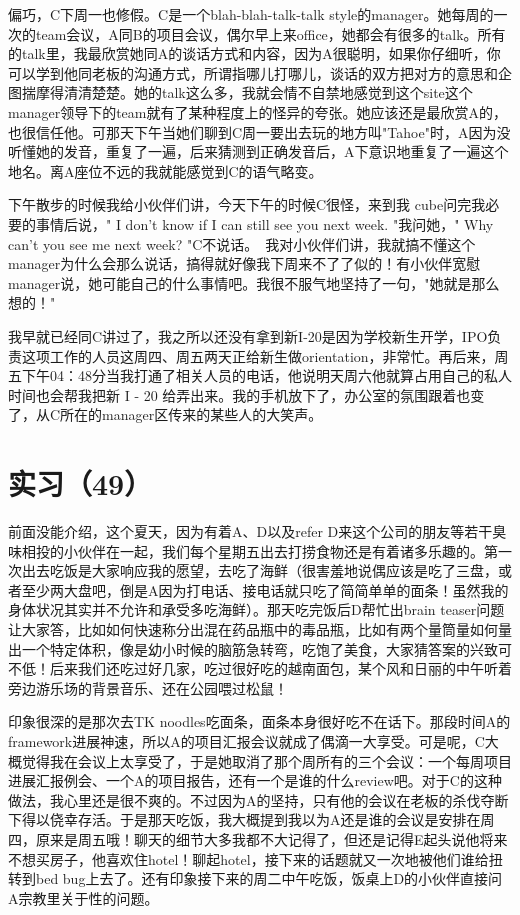 \documentclass[12pt]{book}
\begin{document}
偏巧，C下周一也修假。C是一个blah-blah-talk-talk style的manager。她每周的一次的team会议，A同B的项目会议，偶尔早上来office，她都会有很多的talk。所有的talk里，我最欣赏她同A的谈话方式和内容，因为A很聪明，如果你仔细听，你可以学到他同老板的沟通方式，所谓指哪儿打哪儿，谈话的双方把对方的意思和企图揣摩得清清楚楚。她的talk这么多，我就会情不自禁地感觉到这个site这个manager领导下的team就有了某种程度上的怪异的夸张。她应该还是最欣赏A的，也很信任他。可那天下午当她们聊到C周一要出去玩的地方叫"Tahoe"时，A因为没听懂她的发音，重复了一遍，后来猜测到正确发音后，A下意识地重复了一遍这个地名。离A座位不远的我就能感觉到C的语气略变。

下午散步的时候我给小伙伴们讲，今天下午的时候C很怪，来到我  cube问完我必要的事情后说，" I don't know if I can still see you next week. "我问她，" Why can't you see me next week? "C不说话。　我对小伙伴们讲，我就搞不懂这个manager为什么会那么说话，搞得就好像我下周来不了了似的！有小伙伴宽慰manager说，她可能自己的什么事情吧。我很不服气地坚持了一句，"她就是那么想的！"

我早就已经同C讲过了，我之所以还没有拿到新I-20是因为学校新生开学，IPO负责这项工作的人员这周四、周五两天正给新生做orientation，非常忙。再后来，周五下午04：48分当我打通了相关人员的电话，他说明天周六他就算占用自己的私人时间也会帮我把新 I - 20 给弄出来。我的手机放下了，办公室的氛围跟着也变了，从C所在的manager区传来的某些人的大笑声。　


\section{实习（49）}
\label{sec-5-52}

前面没能介绍，这个夏天，因为有着A、D以及refer D来这个公司的朋友等若干臭味相投的小伙伴在一起，我们每个星期五出去打捞食物还是有着诸多乐趣的。第一次出去吃饭是大家响应我的愿望，去吃了海鲜（很害羞地说偶应该是吃了三盘，或者至少两大盘吧，倒是A因为打电话、接电话就只吃了简简单单的面条！虽然我的身体状况其实并不允许和承受多吃海鲜）。那天吃完饭后D帮忙出brain teaser问题让大家答，比如如何快速称分出混在药品瓶中的毒品瓶，比如有两个量筒量如何量出一个特定体积，像是幼小时候的脑筋急转弯，吃饱了美食，大家猜答案的兴致可不低！后来我们还吃过好几家，吃过很好吃的越南面包，某个风和日丽的中午听着旁边游乐场的背景音乐、还在公园喂过松鼠！

印象很深的是那次去TK noodles吃面条，面条本身很好吃不在话下。那段时间A的framework进展神速，所以A的项目汇报会议就成了偶滴一大享受。可是呢，C大概觉得我在会议上太享受了，于是她取消了那个周所有的三个会议：一个每周项目进展汇报例会、一个A的项目报告，还有一个是谁的什么review吧。对于C的这种做法，我心里还是很不爽的。不过因为A的坚持，只有他的会议在老板的杀伐夺断下得以侥幸存活。于是那天吃饭，我大概提到我以为A还是谁的会议是安排在周四，原来是周五哦！聊天的细节大多我都不大记得了，但还是记得E起头说他将来不想买房子，他喜欢住hotel！聊起hotel，接下来的话题就又一次地被他们谁给扭转到bed bug上去了。还有印象接下来的周二中午吃饭，饭桌上D的小伙伴直接问A宗教里关于性的问题。
\end{document}
